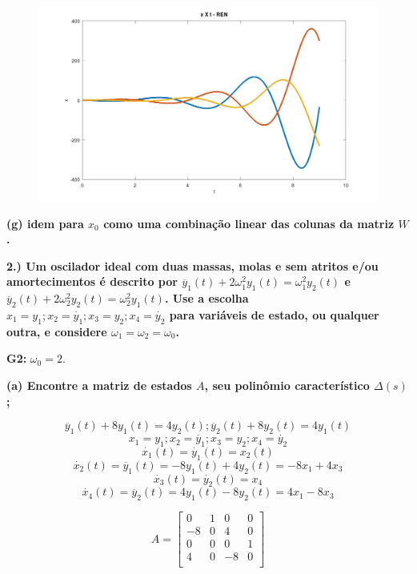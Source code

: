 \documentclass[11pt]{article}
\begin{document}
\begin{figure}[h]
  \includegraphics[scale=0.25]{plot1f2.jpg}
  \centering
\end{figure}

\textbf{(g) idem para $x_0$ como uma combinação linear das colunas da matriz $W$.}


\vspace{\baselineskip}

\textbf{2.) Um oscilador ideal com duas massas, molas e sem atritos e/ou amortecimentos é descrito por $\ddot{y_1}(t) + 2\omega_1^2 y_1(t) = \omega_1^2 y_2(t)$ e $\ddot{y_2}(t) + 2\omega_2^2 y_2(t) = \omega_2^2 y_1(t)$. Use a escolha $x_1 = y_1; x_2 = \dot{y_1}; x_3 = y_2; x_4 = \dot{y_2}$ para variáveis de estado, ou qualquer outra, e considere $\omega_1 = \omega_2 = \omega_0$.}

\textbf{G2: } $\omega_0 = 2$.

\textbf{(a) Encontre a matriz de estados $A$, seu polinômio característico $\Delta(s)$;}

\[\ddot{y_1}(t) + 8 y_1(t) = 4 y_2(t) ; \ddot{y_2}(t) + 8 y_2(t) = 4 y_1(t)\]
\[x_1 = y_1; x_2 = \dot{y_1}; x_3 = y_2; x_4 = \dot{y_2}\]
\[\dot{x_1}(t) = \dot{y_1}(t) = x_2(t)\]
\[\dot{x_2}(t) = \ddot{y_1}(t) = - 8 y_1(t) + 4 y_2(t) = - 8 x_1 + 4 x_3\]
\[\dot{x_3}(t) = \dot{y_2}(t) = x_4\]
\[\dot{x_4}(t) = \ddot{y_2}(t) = 4 y_1(t) - 8 y_2(t) = 4 x_1 - 8 x_3\]

\[A = \left[ {\begin{array}{cccc}
  0 & 1 & 0 & 0 \\
  -8 & 0 & 4 & 0 \\
  0 & 0 & 0 & 1 \\
  4 & 0 & -8 & 0 \\
\end{array} } \right]\]
\end{document}
